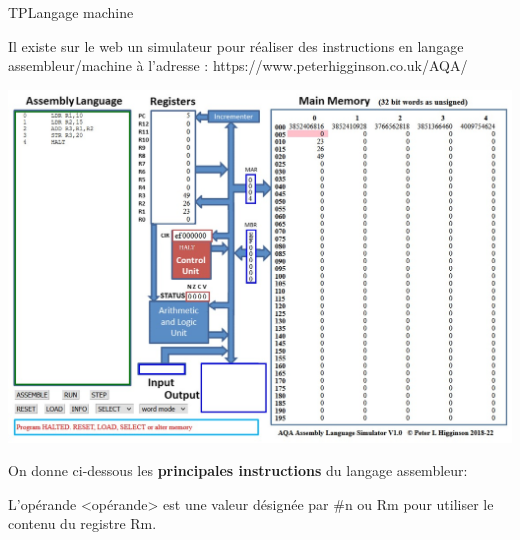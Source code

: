\documentclass[12pt,a4paper]{article}
\begin{document}
\begin{NSI}
{TP}{Langage machine}
\end{NSI}



Il existe sur le web un simulateur pour réaliser des instructions en langage assembleur/machine à l'adresse : \textsf{https://www.peterhigginson.co.uk/AQA/}\medskip

\begin{center}
\includegraphics[scale=0.8]{../img/simulateur.jpg}
\end{center}

On donne ci-dessous les \textbf{principales instructions} du langage assembleur:\medskip

L'opérande <opérande> est une valeur désignée par \textsf{\#n}  ou \textsf{Rm} pour utiliser le contenu du registre Rm. 
\end{document}
